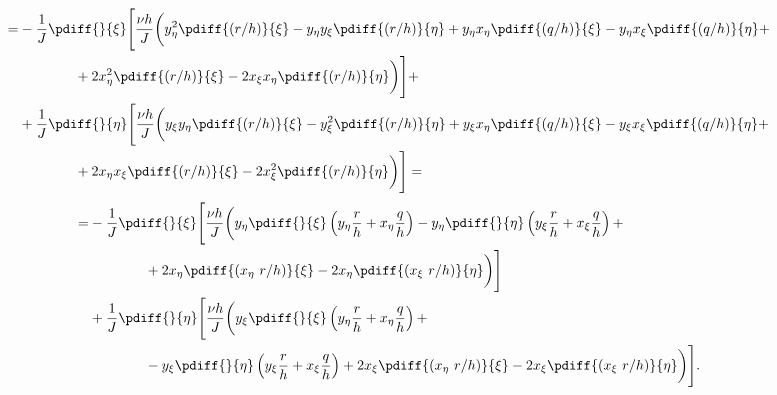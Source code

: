 %
	\begin{align}
		\begin{aligned}
			=& - \frac{1}{J} \pdiff{}{\xi} \Bigg[ \frac{\nu h}{J} \bigg(y_{\eta}^2 \pdiff{(r/h)}{\xi} - y_{\eta} y_{\xi} \pdiff{(r/h)}{\eta} + y_{\eta} x_{\eta} \pdiff{(q/h)}{\xi} - y_{\eta} x_{\xi} \pdiff{(q/h)}{\eta}+
            \\
			& \qquad \qquad + 2  x_{\eta}^2 \pdiff{(r/h)}{\xi} - 2  x_{\xi} x_{\eta}  \pdiff{(r/h)}{\eta} \bigg) \Bigg] +
            \\
			&+ \frac{1}{J} \pdiff{}{\eta} \Bigg[ \frac{\nu h}{J} \bigg(y_{\xi} y_{\eta} \pdiff{(r/h)}{\xi} - y_{\xi}^2 \pdiff{(r/h)}{\eta} + y_{\xi} x_{\eta} \pdiff{(q/h)}{\xi} - y_{\xi} x_{\xi} \pdiff{(q/h)}{\eta} +
            \\
			& \qquad \qquad + 2 x_{\eta}x_{\xi} \pdiff{(r/h)}{\xi} - 2x_{\xi}^2 \pdiff{(r/h)}{\eta} \bigg) \Bigg] =
		\end{aligned}
	\end{align}
%
	\begin{align}
		\begin{aligned}
			=& - \frac{1}{J} \pdiff{}{\xi} \Bigg[\frac{\nu h}{J} \bigg(
			y_{\eta} \pdiff{}{\xi} \left(y_{\eta} \frac{r}{h}
			+ x_{\eta} \frac{q}{h}\right)
			- y_{\eta} \pdiff{}{\eta} \left( y_{\xi} \frac{r}{h}
			+ x_{\xi} \frac{q}{h}  \right) +
            \\
			& \qquad \qquad + 2 x_{\eta} \pdiff{(x_{\eta}\ r/h)}{\xi}
			- 2 x_{\eta}  \pdiff{(x_{\xi}\ r/h)}{\eta} \bigg) \Bigg]\\
			& + \frac{1}{J} \pdiff{}{\eta} \Bigg[\frac{\nu h}{J} \bigg(
			y_{\xi} \pdiff{}{\xi} \left(y_{\eta} \frac{r}{h}
			+ x_{\eta} \frac{q}{h}\right) +
            \\
			&\qquad \qquad - y_{\xi} \pdiff{}{\eta} \left( y_{\xi} \frac{r}{h}
			+ x_{\xi} \frac{q}{h} \right)
			+ 2 x_{\xi} \pdiff{(x_{\eta}\ r/h)}{\xi}
			- 2 x_{\xi} \pdiff{(x_{\xi}\ r/h)}{\eta} \bigg) \Bigg].
		\end{aligned}
	\end{align}

